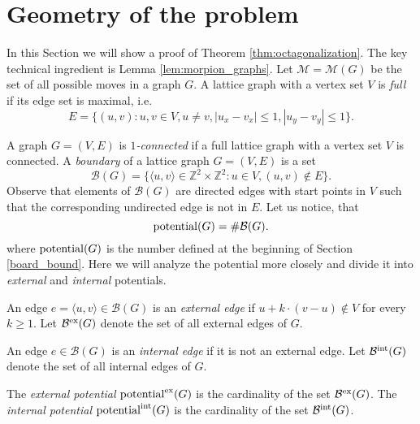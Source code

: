 
\section{Geometry of the problem}
\label{geometry}

In this Section we will show a proof of Theorem \ref{thm:octagonalization}. The key technical ingredient is Lemma \ref{lem:morpion_graphs}.
Let $\mathcal{M} = \mathcal{M}(G)$ be the set of all possible moves in a graph $G$. 
A lattice graph with a vertex set $V$ is \emph{full} if its edge set is maximal, i.e.
\[ 
  E = \{ (u,v) \colon  u, v \in V, u \neq v,   |u_x - v_x| \leq 1, | u_y - v_y | \leq 1 \}.
\]


A graph $G = (V, E)$ is \emph{$1$-connected} if a full lattice graph with a vertex set $V$ is connected.
A \emph{boundary} of a lattice graph $G = (V, E)$ is a set 
\[
  \mathcal{B}(G) = \{ \langle u, v \rangle \in \mathbb{Z}^2 \times \mathbb{Z}^2 \colon u \in V, (u, v) \not\in E \}.
\]
Observe that elements of $\mathcal{B}(G)$ are directed edges with start points in $V$ such that the corresponding undirected edge is not in $E$. Let us notice, that 
\[
  \operatorname{potential}(G) = \# \mathcal{B}(G).
\]
where $\operatorname{potential}(G)$ is the number defined at the beginning of Section \ref{board_bound}. Here we will analyze the potential more closely and divide it into {\em external} and {\em internal} potentials. 

An edge $e = \langle u, v \rangle \in \mathcal{B}(G)$ is an \emph{external edge} if $u + k \cdot (v - u) \not\in V$ for every
$k \geq 1$. Let $\mathcal{B}^{\operatorname{ex}}(G)$ denote the set of all external edges of $G$.

An edge $e \in \mathcal{B}(G)$ is an \emph{internal edge} if it is not an external edge. Let $\mathcal{B}^{\operatorname{int}}(G)$ denote the set of all internal edges of $G$.

The \emph{external potential} $\operatorname{potential}^{\operatorname{ex}}(G)$ is the cardinality of the set $\mathcal{B}^{\operatorname{ex}}(G)$. 
The \emph{internal potential} $\operatorname{potential}^{\operatorname{int}}(G)$ is the cardinality of the set $\mathcal{B}^{\operatorname{int}}(G)$.

